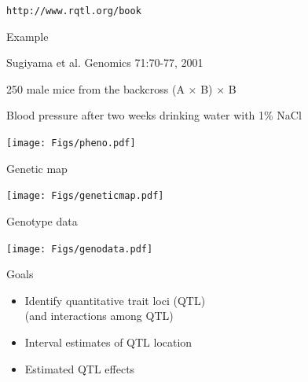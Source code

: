 \documentclass[12pt]{article}
\newcommand{\headsize}{\fontsize{35}{35} \selectfont}
\newcommand{\smallsize}{\fontsize{25}{30} \selectfont}
\newcommand{\smallersize}{\fontsize{20}{25} \selectfont}
\newcommand{\smallestsize}{\fontsize{18}{22} \selectfont}
\begin{document}
\vfill

\smallestsize \color{mywhite} \verb|http://www.rqtl.org/book|


\newpage

\addtocounter{page}{-1}

\headsize \color{myyellow}
\hfill \begin{minipage}{5.75in}
\centering
Example
\end{minipage}

\vspace{30mm}

\hfill
\begin{minipage}{10in}
\smallersize \color{mywhite}
Sugiyama et al. Genomics 71:70-77, 2001

\vspace{16pt}

\smallestsize
\color{myblue}
250 male mice from the backcross (A $\times$ B) $\times$ B

Blood pressure after two weeks drinking water with 1\% NaCl
\end{minipage}

\vspace{15mm}


\centerline{\texttt{[image: Figs/pheno.pdf]}}

\newpage

\headsize \color{myyellow}
\hfill \begin{minipage}{5.75in}
\centering
Genetic map
\end{minipage}

\vfill

\centerline{\texttt{[image: Figs/geneticmap.pdf]}}


\newpage

\headsize \color{myyellow}
\hfill \begin{minipage}{5.75in}
\centering
Genotype data
\end{minipage}

\vfill

\centerline{\texttt{[image: Figs/genodata.pdf]}}


\newpage

\headsize \color{myyellow}
\hfill \begin{minipage}{5.75in}
\centering
Goals
\end{minipage}

\vspace{3cm}

\color{mywhite} \smallsize

\hfill \begin{minipage}[t]{9.5in}
\begin{itemize}
\itemsep24pt
\item Identify quantitative trait loci (QTL) \\[6pt]
   {\color{myblue}   (and interactions among QTL)}
\item Interval estimates of QTL location
\item Estimated QTL effects 
\end{itemize} \end{minipage}
\end{document}
